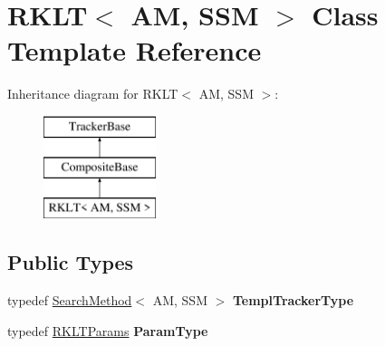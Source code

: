\hypertarget{classRKLT}{\section{R\-K\-L\-T$<$ A\-M, S\-S\-M $>$ Class Template Reference}
\label{classRKLT}
}
Inheritance diagram for R\-K\-L\-T$<$ A\-M, S\-S\-M $>$\-:\begin{figure}[H]
\begin{center}
\leavevmode
\includegraphics[height=3.000000cm]{classRKLT}
\end{center}
\end{figure}
\subsection*{Public Types}
\begin{DoxyCompactItemize}
\item 
\hypertarget{classRKLT_a08fe8686921077be4112ff24563bf183}{typedef \hyperlink{classSearchMethod}{Search\-Method}$<$ A\-M, S\-S\-M $>$ {\bfseries Templ\-Tracker\-Type}}\label{classRKLT_a08fe8686921077be4112ff24563bf183}

\item 
\hypertarget{classRKLT_a69b6dc4bd51f2bc1ff6baddece5a8b6d}{typedef \hyperlink{structRKLTParams}{R\-K\-L\-T\-Params} {\bfseries Param\-Type}}\label{classRKLT_a69b6dc4bd51f2bc1ff6baddece5a8b6d}

\end{DoxyCompactItemize}
